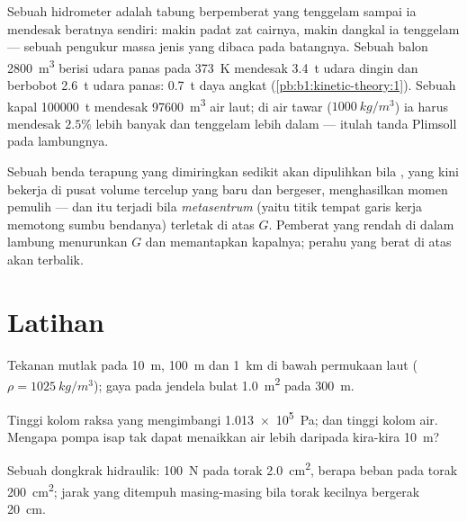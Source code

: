 \begin{example}\label{ex:b1:fluid-statics:buoy}
Sebuah hidrometer adalah tabung berpemberat yang tenggelam sampai ia mendesak
beratnya sendiri: makin padat zat cairnya, makin dangkal ia tenggelam --- sebuah pengukur massa jenis yang dibaca
pada batangnya. Sebuah balon \qty{2800}{m^3} berisi udara panas pada \qty{373}{K} mendesak
\qty{3.4}{t} udara dingin dan berbobot \qty{2.6}{t} udara panas: \qty{0.7}{t}
daya angkat (\cref{pb:b1:kinetic-theory:1}). Sebuah kapal \qty{100000}{t}
mendesak \qty{97600}{m^3} air laut; di air tawar ($\qty{1000}{kg/m^3}$)
ia harus mendesak $2.5\%$ lebih banyak dan tenggelam lebih dalam --- itulah tanda Plimsoll pada
lambungnya.
\end{example}

\begin{remark}[Kemantapan]\label{rem:b1:fluid-statics:stability}
Sebuah benda terapung yang dimiringkan sedikit akan dipulihkan bila ,
yang kini bekerja di pusat volume tercelup yang baru dan bergeser, menghasilkan
momen pemulih --- dan itu terjadi bila \emph{metasentrum} (yaitu titik
tempat garis kerja  memotong sumbu bendanya) terletak di atas
$G$. Pemberat yang rendah di dalam lambung menurunkan $G$ dan memantapkan kapalnya; perahu
yang berat di atas akan terbalik.
\end{remark}

\section{Latihan}

\begin{exercise}[$\star$]\label{exo:b1:fluid-statics:1}
Tekanan mutlak pada \qty{10}{m}, \qty{100}{m} dan \qty{1}{km} di bawah
permukaan laut ($\rho = \qty{1025}{kg/m^3}$); gaya pada jendela bulat \qty{1.0}{m^2} pada
\qty{300}{m}.
\end{exercise}

\begin{exercise}[$\star$]\label{exo:b1:fluid-statics:2}
Tinggi kolom raksa yang mengimbangi \qty{1.013e5}{Pa}; dan tinggi kolom air.
Mengapa pompa isap tak dapat menaikkan air lebih daripada kira-kira \qty{10}{m}?
\end{exercise}

\begin{exercise}[$\star$]\label{exo:b1:fluid-statics:3}
Sebuah dongkrak hidraulik: \qty{100}{N} pada torak \qty{2.0}{cm^2}, berapa beban pada torak
\qty{200}{cm^2}; jarak yang ditempuh masing-masing bila torak kecilnya
bergerak \qty{20}{cm}.
\end{exercise}

